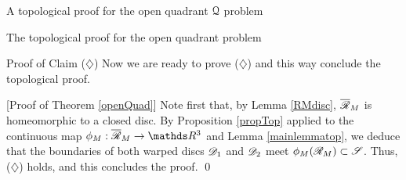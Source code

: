 \documentclass[11pt, a4paper, english, twoside, notitlepage, openright]{report}
\begin{document}
\begin{chapter}{A topological proof for the open quadrant $\mathcal{Q}$ problem}
\begin{section}{The topological proof for the open quadrant problem}
\begin{subsection}{Proof of Claim ($\diamondsuit$)}
Now we are ready to prove ($\diamondsuit$) and this way conclude the topological proof.

\vspace{2mm}		

[Proof of Theorem \ref{openQuad}] Note first that, by Lemma \ref{RMdisc}, $\overline{\mathscr{R}}_M$ is homeomorphic to a closed disc. By Proposition \ref{propTop} applied to the continuous map $\phi_M:\overline{\Rr}_M\to\R^3$ and Lemma \ref{mainlemmatop}, we deduce that the boundaries of both warped discs $\mathscr{D}_1$ and $\mathscr{D}_2$ meet $\phi_M({\mathscr{R}}_M)\subset\mathscr{S}$. Thus, ($\diamondsuit$) holds, and this concludes the proof.
\qed

\end{subsection}
\end{section}
\end{chapter}
\end{document}
